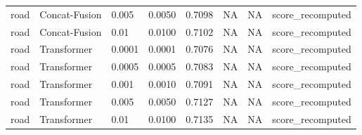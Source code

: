 \begin{tabular}{llllllll}
road & Concat-Fusion & 0.005 & 0.0050 & 0.7098 & NA & NA & score_recomputed \\
road & Concat-Fusion & 0.01 & 0.0100 & 0.7102 & NA & NA & score_recomputed \\
road & Transformer & 0.0001 & 0.0001 & 0.7076 & NA & NA & score_recomputed \\
road & Transformer & 0.0005 & 0.0005 & 0.7083 & NA & NA & score_recomputed \\
road & Transformer & 0.001 & 0.0010 & 0.7091 & NA & NA & score_recomputed \\
road & Transformer & 0.005 & 0.0050 & 0.7127 & NA & NA & score_recomputed \\
road & Transformer & 0.01 & 0.0100 & 0.7135 & NA & NA & score_recomputed \\
\bottomrule
\end{tabular}
